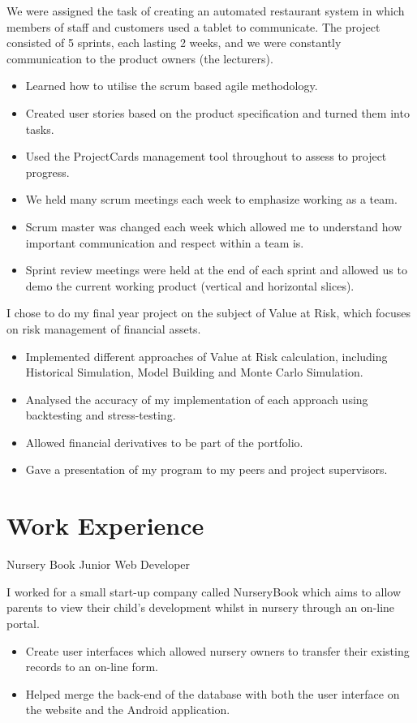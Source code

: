 \documentclass[10pt,a4paper]{moderncv}
\begin{document}
{
We were assigned the task of creating an automated restaurant system in which members of staff and customers used a tablet to communicate. The project consisted of 5 sprints, each lasting 2 weeks, and we were constantly communication to the product owners (the lecturers).
\begin{itemize}
	\item Learned how to utilise the scrum based agile methodology.
	\item Created user stories based on the product specification and turned them into tasks.
	\item Used the ProjectCards management tool throughout to assess to project progress.
	\item We held many scrum meetings each week to emphasize working as a team.
	\item Scrum master was changed each week which allowed me to understand how important communication and respect within a team is.
	\item Sprint review meetings were held at the end of each sprint and allowed us to demo the current working product (vertical and horizontal slices).
\end{itemize}
{
I chose to do my final year project on the subject of Value at Risk, which focuses on risk management of financial assets.
\begin{itemize}
	\item Implemented different approaches of Value at Risk calculation, including Historical Simulation, Model Building and Monte Carlo Simulation.
	\item Analysed the accuracy of my implementation of each approach using backtesting and stress-testing.
	\item Allowed financial derivatives to be part of the portfolio.
	\item Gave a presentation of my program to my peers and project supervisors.
\end{itemize}
}

\section{Work Experience}
{Nursery Book}
{Junior Web Developer}
{}
{}
{
I worked for a small start-up company called NurseryBook which aims to allow parents to view their child's development whilst in nursery through an on-line portal.
\begin{itemize}
	\item Create user interfaces which allowed nursery owners to transfer their existing records to an on-line form.
	\item Helped merge the back-end of the database with both the user interface on the website and the Android application.
\end{itemize}
}

}
\end{document}
